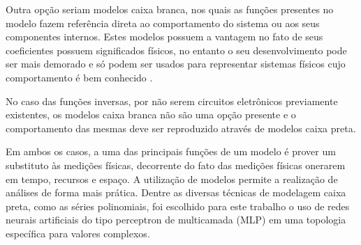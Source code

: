 Outra opção seriam modelos caixa branca, nos quais as funções presentes no modelo fazem referência direta ao comportamento do sistema ou aos seus componentes internos. Estes modelos possuem a vantagem no fato de seus coeficientes possuem significados físicos, no entanto o seu desenvolvimento pode ser mais demorado e só podem ser usados para representar sistemas físicos cujo comportamento é bem conhecido \cite{8882211}.

No caso das funções inversas, por não serem circuitos eletrônicos previamente existentes, os modelos caixa branca não são uma opção presente e o comportamento das mesmas deve ser reproduzido através de modelos caixa preta.

Em ambos os casos, a uma das principais funções de um modelo é prover um substituto às medições físicas, decorrente do fato das medições físicas onerarem em tempo, recursos e espaço. A utilização de modelos permite a realização de análises de forma mais prática.
Dentre as diversas técnicas de modelagem caixa preta, como as séries polinomiais, foi escolhido para este trabalho o uso de redes neurais artificiais do tipo perceptron de multicamada (MLP) em uma topologia específica para valores complexos.

